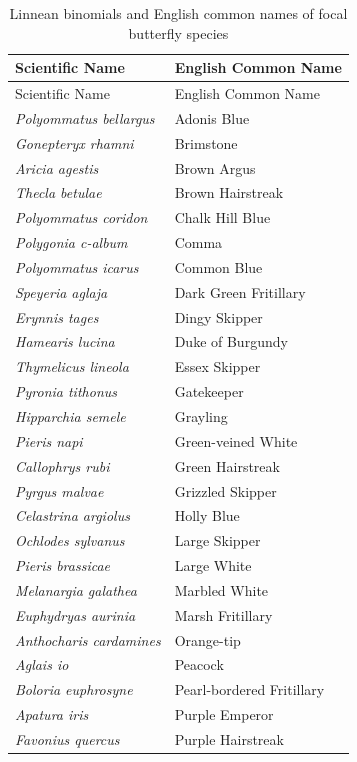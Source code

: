 \documentclass[
]{article}
\begin{document}
\begin{longtable}[]{@{}ll@{}}
\caption{Linnean binomials and English common names of focal butterfly
species}\tabularnewline
\toprule()
Scientific Name & English Common Name \\
\midrule()
\endfirsthead
\toprule()
Scientific Name & English Common Name \\
\midrule()
\endhead
\textit{Polyommatus bellargus} & Adonis Blue \\
\textit{Gonepteryx rhamni} & Brimstone \\
\textit{Aricia agestis} & Brown Argus \\
\textit{Thecla betulae} & Brown Hairstreak \\
\textit{Polyommatus coridon} & Chalk Hill Blue \\
\textit{Polygonia c-album} & Comma \\
\textit{Polyommatus icarus} & Common Blue \\
\textit{Speyeria aglaja} & Dark Green Fritillary \\
\textit{Erynnis tages} & Dingy Skipper \\
\textit{Hamearis lucina} & Duke of Burgundy \\
\textit{Thymelicus lineola} & Essex Skipper \\
\textit{Pyronia tithonus} & Gatekeeper \\
\textit{Hipparchia semele} & Grayling \\
\textit{Pieris napi} & Green-veined White \\
\textit{Callophrys rubi} & Green Hairstreak \\
\textit{Pyrgus malvae} & Grizzled Skipper \\
\textit{Celastrina argiolus} & Holly Blue \\
\textit{Ochlodes sylvanus} & Large Skipper \\
\textit{Pieris brassicae} & Large White \\
\textit{Melanargia galathea} & Marbled White \\
\textit{Euphydryas aurinia} & Marsh Fritillary \\
\textit{Anthocharis cardamines} & Orange-tip \\
\textit{Aglais io} & Peacock \\
\textit{Boloria euphrosyne} & Pearl-bordered Fritillary \\
\textit{Apatura iris} & Purple Emperor \\
\textit{Favonius quercus} & Purple Hairstreak \\

\end{longtable}
\end{document}
